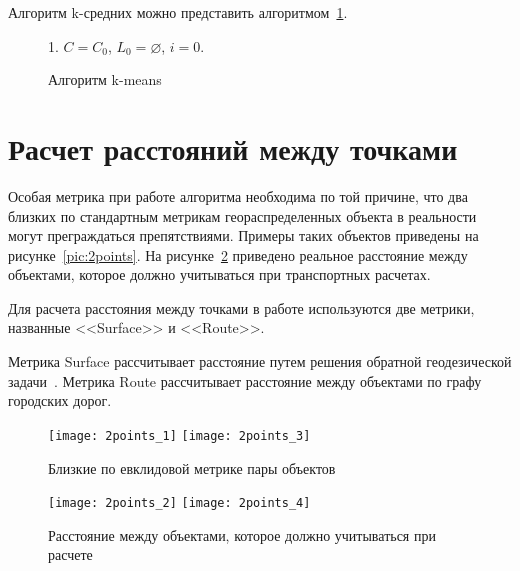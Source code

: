Алгоритм k-средних можно представить алгоритмом~\ref{alg:kmeans}.
\begin{figure}[ht!]
    \begin{algorithm}[H]
        1. \( C = C_0 \), \( L_0 = \varnothing \), \( i = 0\). 
    \end{algorithm}
    \vspace*{-1.5em}
    \caption{Алгоритм k-means}
    \label{alg:kmeans}
\end{figure}

\section{Расчет расстояний между точками} \label{sec:distance}

Особая метрика при работе алгоритма необходима по той причине, что два близких по стандартным метрикам геораспределенных объекта в реальности могут преграждаться препятствиями. Примеры таких объектов приведены на рисунке~\ref{pic:2points}. На рисунке~\ref{pic:2points-1} приведено реальное расстояние между объектами, которое должно учитываться при транспортных расчетах.

Для расчета расстояния между точками в работе используются две метрики, названные <<Surface>> и <<Route>>.

Метрика Surface рассчитывает расстояние путем решения обратной геодезической задачи~\cite[с. 48-50]{geodesic}. Метрика Route рассчитывает расстояние между объектами по графу городских дорог.

\begin{figure}[t!]
    \centering
    \texttt{[image: 2points\_1]} \hspace{1ex}
    \texttt{[image: 2points\_3]} \\[.5ex]
    \parbox{.9\textwidth}{\caption{Близкие по евклидовой метрике пары объектов}\label{pic:2points}}
    \texttt{[image: 2points\_2]} \hspace{1ex}
    \texttt{[image: 2points\_4]} \\[.5ex]
    \parbox{.9\textwidth}{\caption{Расстояние между объектами, которое должно учитываться при расчете}\label{pic:2points-1}}
\end{figure}

